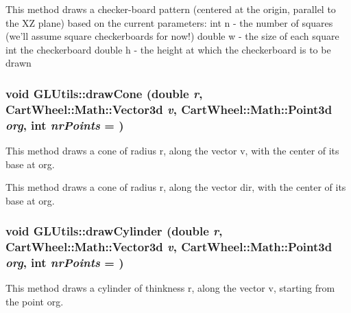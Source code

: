 This method draws a checker-\/board pattern (centered at the origin, parallel to the XZ plane) based on the current parameters: int n -\/ the number of squares (we'll assume square checkerboards for now!) double w -\/ the size of each square int the checkerboard double h -\/ the height at which the checkerboard is to be drawn \hypertarget{classCartWheel_1_1GL_1_1GLUtils_a981b7a750f3e431914d8fd3ff13713d1}{
\subsubsection[{drawCone}]{\setlength{\rightskip}{0pt plus 5cm}void GLUtils::drawCone (double {\em r}, \/  {\bf CartWheel::Math::Vector3d} {\em v}, \/  {\bf CartWheel::Math::Point3d} {\em org}, \/  int {\em nrPoints} = {})}}
\label{classCartWheel_1_1GL_1_1GLUtils_a981b7a750f3e431914d8fd3ff13713d1}
This method draws a cone of radius r, along the vector v, with the center of its base at org.

This method draws a cone of radius r, along the vector dir, with the center of its base at org. \hypertarget{classCartWheel_1_1GL_1_1GLUtils_a06961de0b130d7e3171f7d6910ff35f1}{
\subsubsection[{drawCylinder}]{\setlength{\rightskip}{0pt plus 5cm}void GLUtils::drawCylinder (double {\em r}, \/  {\bf CartWheel::Math::Vector3d} {\em v}, \/  {\bf CartWheel::Math::Point3d} {\em org}, \/  int {\em nrPoints} = {})}}
\label{classCartWheel_1_1GL_1_1GLUtils_a06961de0b130d7e3171f7d6910ff35f1}
This method draws a cylinder of thinkness r, along the vector v, starting from the point org.

